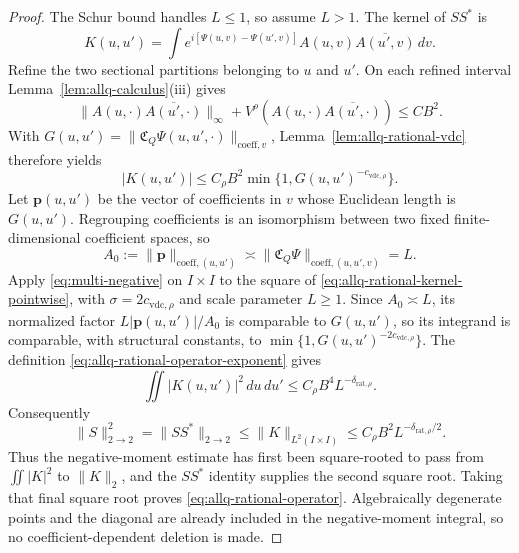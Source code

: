 \documentclass[11pt]{article}
\numberwithin{equation}{section}
\theoremstyle{remark}
\theoremstyle{definition}
\begin{document}
\begin{proof}
The Schur bound handles $L\le1$, so assume $L>1$. The kernel of $SS^*$ is
\[
 K(u,u')=\int e^{i[\Psi(u,v)-\Psi(u',v)]}
 A(u,v)\overline{A(u',v)}\,dv.
\]
Refine the two sectional partitions belonging to $u$ and $u'$. On each
refined interval Lemma~\ref{lem:allq-calculus}(iii) gives
\[
 \|A(u,\cdot)\overline{A(u',\cdot)}\|_\infty+
 V^\rho(A(u,\cdot)\overline{A(u',\cdot)})\le CB^2.
\]
With
$G(u,u')=\|\mathfrak C_Q\Psi(u,u',\cdot)\|_{\mathrm{coeff},v}$,
Lemma~\ref{lem:allq-rational-vdc} therefore yields
\begin{equation}\label{eq:allq-rational-kernel-pointwise}
 |K(u,u')|
 \le C_\rho B^2
 \min\{1,G(u,u')^{-c_{\mathrm{vdc},\rho}}\}.
\end{equation}
Let $\mathbf p(u,u')$ be the vector of coefficients in $v$ whose Euclidean
length is $G(u,u')$.  Regrouping coefficients is an isomorphism between two
fixed finite-dimensional coefficient spaces, so
\[
 A_0:=\|\mathbf p\|_{\mathrm{coeff},(u,u')}
 \asymp \|\mathfrak C_Q\Psi\|_{\mathrm{coeff},(u,u',v)}=L.
\]
Apply \eqref{eq:multi-negative} on $I\times I$ to the square of
\eqref{eq:allq-rational-kernel-pointwise}, with
$\sigma=2c_{\mathrm{vdc},\rho}$ and scale parameter $L\ge1$.  Since
$A_0\asymp L$, its normalized factor
$L|\mathbf p(u,u')|/A_0$ is comparable to $G(u,u')$, so its integrand is
comparable, with structural constants, to
$\min\{1,G(u,u')^{-2c_{\mathrm{vdc},\rho}}\}$.  The definition
\eqref{eq:allq-rational-operator-exponent} gives
\[
 \iint |K(u,u')|^2\,du\,du'
 \le C_\rho B^4 L^{-\delta_{\mathrm{rat},\rho}}.
\]
Consequently
\[
 \|S\|_{2\to2}^2=\|SS^*\|_{2\to2}
 \le\|K\|_{L^2(I\times I)}
 \le C_\rho B^2L^{-\delta_{\mathrm{rat},\rho}/2}.
\]
Thus the negative-moment estimate has first been square-rooted to pass
from $\iint|K|^2$ to $\|K\|_2$, and the $SS^*$ identity supplies the
second square root.  Taking that final square root proves
\eqref{eq:allq-rational-operator}. Algebraically degenerate points and
the diagonal are already included in the negative-moment integral, so no
coefficient-dependent deletion is made.
\end{proof}
\end{document}
